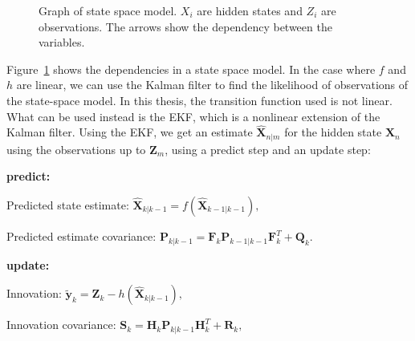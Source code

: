 \begin{figure}[H]
\begin{center}
\end{center}
     \caption[State space model]{Graph of state space model. $X_i$ are hidden states and $Z_i$ are observations. The arrows show the dependency between the variables.}
    \label{fig: state space model}
\end{figure}
 
 Figure~\ref{fig: state space model} shows the dependencies in a state space model. In the case where $f$ and $h$ are linear, we can use the Kalman filter to find the likelihood of observations of the state-space model. In this thesis, the transition function used is not linear. What can be used instead is the EKF, which is a nonlinear extension of the Kalman filter. Using the EKF, we get an estimate $\hat{\textbf{X}}_{n|m}$ for the hidden state $\textbf{X}_n$ using the observations up to $\textbf{Z}_m$, using a predict step and an update step:




\textbf{predict:}

Predicted state estimate: $\bm{\hat X}_{k|k-1} = f(\bm{\hat X}_{k-1|k-1} ),$

Predicted estimate covariance: $\textbf{P}_{k|k-1} = \textbf{F}_k\textbf{P}_{k-1|k-1} \textbf{F}_k^T + \textbf{Q}_k.$



\textbf{update:}

Innovation: $\bm{\tilde y}_{k} = \textbf{Z}_k - h(\bm{\hat X}_{k|k-1}),$

Innovation covariance: $\textbf{S}_k = \textbf{H}_k \textbf{P}_{k|k-1}\textbf{H}_k^T + \textbf{R}_k,$

